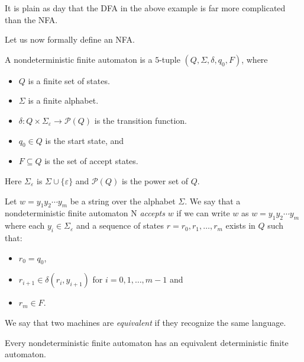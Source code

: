It is plain as day that the DFA in the above example is far more complicated than the NFA.

Let us now formally define an NFA.
\begin{definition}
A nondeterministic finite automaton is a $5$-tuple $(Q,\Sigma,\delta,q_0,F)$, where
\begin{itemize}
	\item $Q$ is a finite set of states.
	\item $\Sigma$ is a finite alphabet.
	\item $\delta:Q\times\Sigma_\varepsilon\to\mathcal{P}(Q)$ is the transition function.
	\item $q_0\in Q$ is the start state, and
	\item $F\subseteq Q$ is the set of accept states.
\end{itemize}
\end{definition}

Here $\Sigma_\varepsilon$ is $\Sigma\cup\{\varepsilon\}$ and $\mathcal{P}(Q)$ is the power set of $Q$.

\vspace{3mm}
Let $w=y_1y_2\cdots y_m$ be a string over the alphabet $\Sigma$. We say that a nondeterministic finite automaton N \textit{accepts} $w$ if we can write $w$ as $w=y_1y_2\cdots y_m$ where each $y_i\in\Sigma_\varepsilon$ and a sequence of states $r=r_0,r_1,\ldots,r_m$ exists in $Q$ such that:
\begin{itemize}
	\item $r_0=q_0$,
	\item $r_{i+1}\in\delta(r_i, y_{i+1})$ for $i=0,1,\ldots,m-1$ and
	\item $r_m\in F$.
\end{itemize}

\begin{definition}
We say that two machines are \textit{equivalent} if they recognize the same language.
\end{definition}
\begin{theorem}
Every nondeterministic finite automaton has an equivalent deterministic finite automaton.
\end{theorem}

